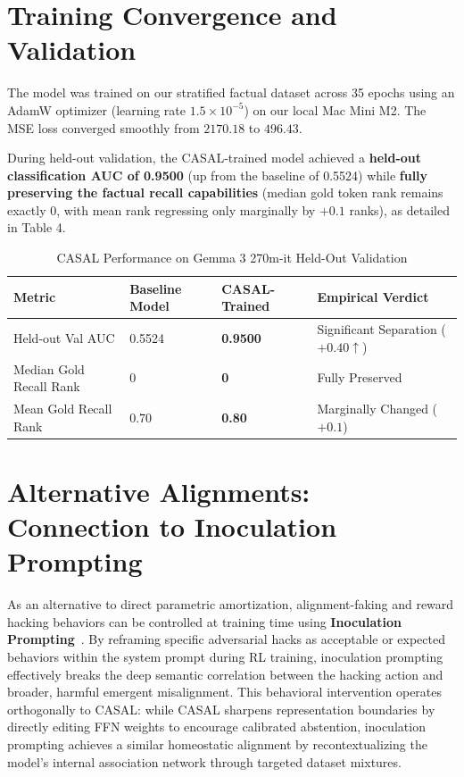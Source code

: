 \documentclass[11pt,a4paper,oneside]{scrbook}
\begin{document}
\chapter{Training Convergence and Validation}
The model was trained on our stratified factual dataset across 35 epochs using an AdamW optimizer (learning rate $1.5\times 10^{-5}$) on our local Mac Mini M2. The MSE loss converged smoothly from $2170.18$ to $496.43$. 

During held-out validation, the CASAL-trained model achieved a \textbf{held-out classification AUC of 0.9500} (up from the baseline of 0.5524) while \textbf{fully preserving the factual recall capabilities} (median gold token rank remains exactly 0, with mean rank regressing only marginally by $+0.1$ ranks), as detailed in Table 4.

\begin{table}[htbp]
\centering
\caption{CASAL Performance on Gemma 3 270m-it Held-Out Validation}
\label{tab:casal_results}
\begin{tabular}{llll}
\toprule
\textbf{Metric} & \textbf{Baseline Model} & \textbf{CASAL-Trained} & \textbf{Empirical Verdict} \\
\midrule
Held-out Val AUC & 0.5524 & \textbf{0.9500} & Significant Separation ($+0.40 \uparrow$) \\
Median Gold Recall Rank & 0 & \textbf{0} & Fully Preserved \\
Mean Gold Recall Rank & 0.70 & \textbf{0.80} & Marginally Changed ($+0.1$) \\
\bottomrule
\end{tabular}
\end{table}

\chapter{Alternative Alignments: Connection to Inoculation Prompting}
As an alternative to direct parametric amortization, alignment-faking and reward hacking behaviors can be controlled at training time using \textbf{Inoculation Prompting}~\cite{macdiarmid2025natural}. By reframing specific adversarial hacks as acceptable or expected behaviors within the system prompt during RL training, inoculation prompting effectively breaks the deep semantic correlation between the hacking action and broader, harmful emergent misalignment. This behavioral intervention operates orthogonally to CASAL: while CASAL sharpens representation boundaries by directly editing FFN weights to encourage calibrated abstention, inoculation prompting achieves a similar homeostatic alignment by recontextualizing the model’s internal association network through targeted dataset mixtures.
\end{document}
